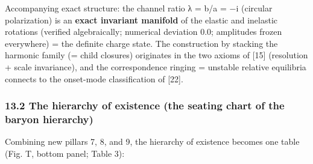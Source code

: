 \documentclass[
]{article}
\begin{document}
Accompanying exact structure: the channel ratio λ = b/a = −i (circular
polarization) is an \textbf{exact invariant manifold} of the elastic and
inelastic rotations (verified algebraically; numerical deviation 0.0;
amplitudes frozen everywhere) = the definite charge state. The
construction by stacking the harmonic family (= child closures)
originates in the two axioms of {[}15{]} (resolution + scale
invariance), and the correspondence ringing = unstable relative
equilibria connects to the onset-mode classification of {[}22{]}.

\subsubsection{13.2 The hierarchy of existence (the seating chart of the
baryon
hierarchy)}\label{the-hierarchy-of-existence-the-seating-chart-of-the-baryon-hierarchy}

Combining new pillars 7, 8, and 9, the hierarchy of existence becomes
one table (Fig. T, bottom panel; Table 3):
\end{document}
